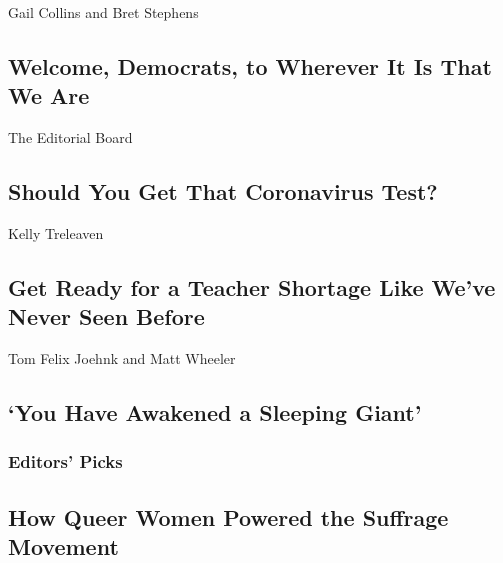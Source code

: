 \href{/2020/08/17/opinion/trump-biden-harris-democratic-convention.html}{}

Gail Collins and Bret Stephens

\hypertarget{welcome-democrats-to-wherever-it-is-that-we-are}{%
\subsection{Welcome, Democrats, to Wherever It Is That We
Are}\label{welcome-democrats-to-wherever-it-is-that-we-are}}

\href{/2020/08/16/opinion/us-coronavirus-testing.html}{}

The Editorial Board

\hypertarget{should-you-get-that-coronavirus-test}{%
\subsection{Should You Get That Coronavirus
Test?}\label{should-you-get-that-coronavirus-test}}

\href{/2020/08/17/opinion/coronavirus-schools-teachers.html}{}

Kelly Treleaven

\hypertarget{get-ready-for-a-teacher-shortage-like-weve-never-seen-before}{%
\subsection{Get Ready for a Teacher Shortage Like We've Never Seen
Before}\label{get-ready-for-a-teacher-shortage-like-weve-never-seen-before}}

\href{/2020/08/17/opinion/thailand-protests.html}{}

Tom Felix Joehnk and Matt Wheeler

\hypertarget{you-have-awakened-a-sleeping-giant}{%
\subsection{`You Have Awakened a Sleeping
Giant'}\label{you-have-awakened-a-sleeping-giant}}

\hypertarget{editors-picks}{%
\subsubsection{Editors' Picks}\label{editors-picks}}

\href{/2020/08/14/us/queer-lesbian-women-suffrage.html}{}

\hypertarget{how-queer-women-powered-the-suffrage-movement}{%
\subsection{How Queer Women Powered the Suffrage
Movement}\label{how-queer-women-powered-the-suffrage-movement}}

